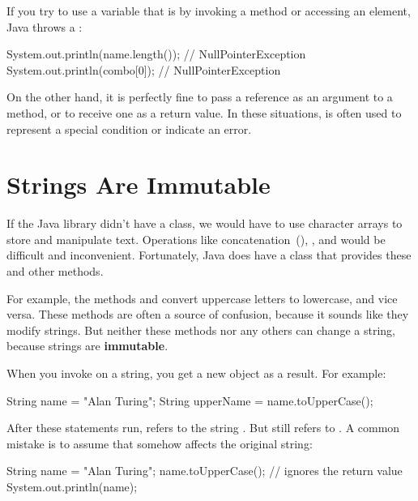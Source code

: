 
If you try to use a variable that is  by invoking a method or accessing an element, Java throws a :

\begin{code}
System.out.println(name.length());  // NullPointerException
System.out.println(combo[0]);       // NullPointerException
\end{code}

On the other hand, it is perfectly fine to pass a  reference as an argument to a method, or to receive one as a return value.
In these situations,  is often used to represent a special condition or indicate an error.


\section{Strings Are Immutable}

If the Java library didn't have a  class, we would have to use character arrays to store and manipulate text.
Operations like concatenation~(\java{+}), , and  would be difficult and inconvenient.
Fortunately, Java does have a  class that provides these and other methods.


For example, the methods  and  convert uppercase letters to lowercase, and vice versa.
These methods are often a source of confusion, because it sounds like they modify strings.
But neither these methods nor any others can change a string, because strings are {\bf immutable}.

When you invoke  on a string, you get a new  object as a result.
For example:

\begin{code}
String name = "Alan Turing";
String upperName = name.toUpperCase();
\end{code}


After these statements run,  refers to the string .
But  still refers to .
A common mistake is to assume that  somehow affects the original string:

\begin{code}
String name = "Alan Turing";
name.toUpperCase();           // ignores the return value
System.out.println(name);
\end{code}

